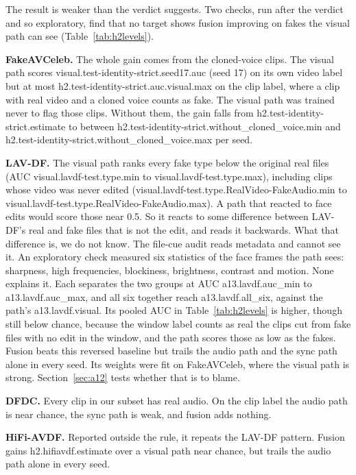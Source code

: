The result is weaker than the verdict suggests.
Two checks, run after the verdict and so exploratory, find that no target
shows fusion improving on fakes the visual path can see
(Table~\ref{tab:h2levels}).

\textbf{FakeAVCeleb.} The whole gain comes from the cloned-voice clips. The
visual path scores {{visual.test-identity-strict.seed17.auc}} (seed 17) on its
own video label but at most {{h2.test-identity-strict.auc.visual.max}} on the
clip label, where a clip with real video and a cloned voice counts as fake.
The visual path was trained never to flag those clips. Without them, the gain
falls from {{h2.test-identity-strict.estimate}} to between
{{h2.test-identity-strict.without_cloned_voice.min}} and
{{h2.test-identity-strict.without_cloned_voice.max}} per seed.

\textbf{LAV-DF.} The visual path ranks every fake type below the original real files
(AUC {{visual.lavdf-test.type.min}} to {{visual.lavdf-test.type.max}}),
including clips whose video was never edited
({{visual.lavdf-test.type.RealVideo-FakeAudio.min}} to
{{visual.lavdf-test.type.RealVideo-FakeAudio.max}}). A path that reacted to
face edits would score those near 0.5. So it reacts to some difference
between LAV-DF's real and fake files that is not the edit, and reads it
backwards. What that difference is, we do not know. The file-cue audit reads
metadata and cannot see it. An exploratory check measured six
statistics of the face frames the path sees: sharpness, high frequencies,
blockiness, brightness, contrast and motion. None explains it. Each separates
the two groups at AUC {{a13.lavdf.auc_min}} to {{a13.lavdf.auc_max}}, and all
six together reach {{a13.lavdf.all_six}}, against the path's
{{a13.lavdf.visual}}. Its pooled AUC in Table~\ref{tab:h2levels} is higher,
though still below chance, because the window label counts as real the clips
cut from fake files with no edit in the window, and the path scores those as
low as the fakes. Fusion beats this reversed baseline but trails
the audio path and the sync path alone in every seed. Its weights were fit on
FakeAVCeleb, where the visual path is strong. Section~\ref{sec:a12} tests
whether that is to blame.

\textbf{DFDC.} Every clip in our subset has real audio. On the clip label the
audio path is near chance, the sync path is weak, and fusion adds nothing.

\textbf{HiFi-AVDF.} Reported outside the rule, it repeats the LAV-DF
pattern. Fusion gains {{h2.hifiavdf.estimate}} over a visual path near
chance, but trails the audio path alone in every seed.

